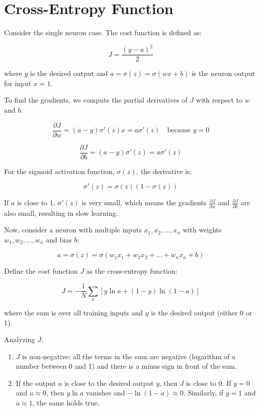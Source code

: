 \section{Cross-Entropy Function}

Consider the single neuron case. The cost function is defined as:

\[
J = \frac{(y - a)^2}{2}
\]

where \( y \) is the desired output and \( a = \sigma(z) = \sigma(wx + b) \) is the neuron output for input \( x = 1 \).

To find the gradients, we compute the partial derivatives of \( J \) with respect to \( w \) and \( b \):

\[
\frac{\partial J}{\partial w} = (a - y) \sigma'(z) x = a \sigma'(z) \quad \text{because } y = 0
\]

\[
\frac{\partial J}{\partial b} = (a - y) \sigma'(z) = a \sigma'(z)
\]

For the sigmoid activation function, \(\sigma(z)\), the derivative is:

\[
\sigma'(z) = \sigma(z)(1 - \sigma(z))
\]

If \( a \) is close to 1, \(\sigma'(z)\) is very small, which means the gradients \(\frac{\partial J}{\partial w}\) and \(\frac{\partial J}{\partial b}\) are also small, resulting in slow learning.

Now, consider a neuron with multiple inputs \( x_1, x_2, \dots, x_n \) with weights \( w_1, w_2, \dots, w_n \) and bias \( b \):

\[
a = \sigma(z) = \sigma(w_1 x_1 + w_2 x_2 + \dots + w_n x_n + b)
\]

Define the cost function \( J \) as the cross-entropy function:

\[
J = -\frac{1}{N} \sum_x \left[y \ln a + (1 - y) \ln (1 - a)\right]
\]

where the sum is over all training inputs and \( y \) is the desired output (either 0 or 1).

Analyzing \( J \):
\begin{enumerate}
    \item \( J \) is non-negative: all the terms in the sum are negative (logarithm of a number between 0 and 1) and there is a minus sign in front of the sum.
    \item If the output \( a \) is close to the desired output \( y \), then \( J \) is close to 0. If \( y = 0 \) and \( a \approx 0 \), then \( y \ln a \) vanishes and \(-\ln(1 - a) \approx 0\). Similarly, if \( y = 1 \) and \( a \approx 1 \), the same holds true.
\end{enumerate}


